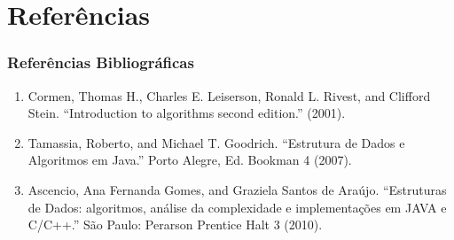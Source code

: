 \documentclass{beamer}
\begin{document}
\section{Referências}

\begin{frame}
    \frametitle{Referências Bibliográficas}
    \begin{enumerate}
        \item Cormen, Thomas H., Charles E. Leiserson, Ronald L. Rivest, and Clifford Stein. ``Introduction to algorithms second edition.'' (2001).
        \item Tamassia, Roberto, and Michael T. Goodrich. ``Estrutura de Dados e Algoritmos em Java.'' Porto Alegre, Ed. Bookman 4 (2007).
        \item Ascencio, Ana Fernanda Gomes, and Graziela Santos de Araújo. ``Estruturas de Dados: algoritmos, análise da complexidade e implementações em JAVA e C/C++.'' São Paulo: Perarson Prentice Halt 3 (2010).
    \end{enumerate}
\end{frame}
\end{document}

